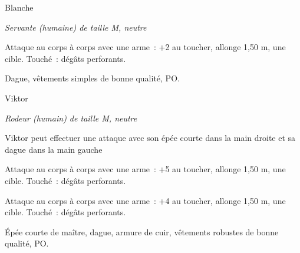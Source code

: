 \documentclass[a4paper,10pt,openany]{book}
\begin{document}
\begin{multicols}{2}
\begin{monsterbox}{Blanche}
	\begin{hangingpar}
		\textit{Servante (humaine) de taille M, neutre}
	\end{hangingpar}
	\dndline%
	\basics[%
	armorclass = 10,
	hitpoints  = \dice{2d8},
	speed      = 9 m
	]
	\dndline%
	\stats[
	STR = \stat{8},
	WIS = \stat{12} 
	]
	\dndline%
	\details[%
	skills=Perception +3,
	senses= Perception passive 13,
	languages = {bas-thrain, vethrain},
	challenge= 1/8
	]
	\dndline%
	\begin{monsteraction}[Dague]
		Attaque au corps à corps avec une arme : +2 au toucher, allonge 1,50 m, une cible. Touché :  dégâts perforants.
	\end{monsteraction}
	\dndline%
	\begin{monsteraction}[Possessions]
		Dague, vêtements simples de bonne qualité,  PO.
	\end{monsteraction}
\end{monsterbox}

\begin{monsterbox}{Viktor}
	\begin{hangingpar}
		\textit{Rodeur (humain) de taille M, neutre}
	\end{hangingpar}
	\dndline%
	\basics[%
	armorclass = 13 (armure de cuir),
	hitpoints  = \dice{4d8 + 4},
	speed      = 9 m
	]
	\dndline%
	\stats[
	STR = \stat{12},
	DEX = \stat{14},
	CON = \stat{12},
	WIS = \stat{12} 
	]
	\dndline%
	\details[%
	skills={Athlétisme +3, Discrétion +4, Nature +2, Médecine +3, Perception +3, Survie +3},
	senses= Perception passive 13,
	languages = {bas-thrain, vethrain},
	challenge= 1/2
	]
	\dndline%
	\begin{monsteraction}
		Viktor peut effectuer une attaque avec son épée courte dans la main droite et sa dague dans la main gauche
	\end{monsteraction}
	\begin{monsteraction}
		Attaque au corps à corps avec une arme : +5 au toucher, allonge 1,50 m, une cible. Touché :  dégâts perforants.
	\end{monsteraction}
	\begin{monsteraction}[Dague]
		Attaque au corps à corps avec une arme : +4 au toucher, allonge 1,50 m, une cible. Touché :  dégâts perforants.
	\end{monsteraction}
	\dndline%
	\begin{monsteraction}[Possessions]
		Épée courte de maître, dague, armure de cuir, vêtements robustes de bonne qualité,  PO.
	\end{monsteraction}
\end{monsterbox}


\end{multicols}
\end{document}

